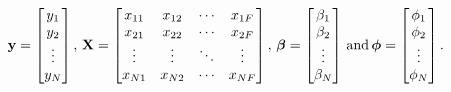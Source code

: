 \begin{equation}
 \mat{y} =
  \begin{bmatrix} 
 	y_{1} \\
 	y_{2} \\
 	\vdots \\
 	y_{N} 
 \end{bmatrix}, \,
%
 \mat{X} =
  \begin{bmatrix}
   x_{11} & x_{12} & \cdots & x_{1F} \\
   x_{21} & x_{22} & \cdots & x_{2F} \\
   \vdots & \vdots & \ddots & \vdots \\
   x_{N1} & x_{N2} & \cdots & x_{NF} 
   \end{bmatrix}, \,
%
 \mat{\beta} =
  \begin{bmatrix} 
 	\beta_{1} \\
 	\beta_{2} \\
 	\vdots \\
 	\beta_{N} 
 \end{bmatrix}\,\text{and} \, 
%
\mat{\phi} =
  \begin{bmatrix} 
 	\phi_{1} \\
 	\phi_{2} \\
 	\vdots \\
 	\phi_{N} 
 \end{bmatrix}.
\end{equation}



